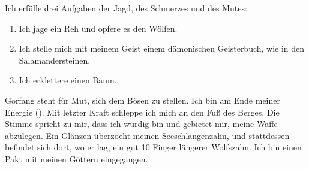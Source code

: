 
Ich erfülle drei Aufgaben der Jagd, des Schmerzes und des Mutes:
\begin{enumerate}
\item Ich jage ein Reh und opfere es den Wölfen. 
\item Ich stelle mich mit meinem Geist einem dämonischen Geisterbuch, wie in den Salamandersteinen.
\item Ich erklettere einen Baum.
\end{enumerate}
Gorfang steht für Mut, sich dem Bösen zu stellen. Ich bin am Ende meiner Energie (). Mit letzter Kraft schleppe ich mich an den Fuß des Berges. Die Stimme spricht zu mir, dass ich würdig bin und gebietet mir, meine Waffe abzulegen. Ein Glänzen überzoeht meinen Seeschlangenzahn, und stattdessen befindet sich dort, wo er lag, ein gut 10 Finger längerer Wolfszahn. Ich bin einen Pakt mit meinen Göttern eingegangen. 


